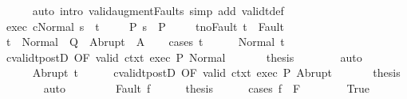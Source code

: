 \begin{isabellebody}
\ \ \ \ \isamarkupfalse%
\ {\isacharparenleft}auto\ intro{\isacharcolon}\ valid{\isacharunderscore}augment{\isacharunderscore}Faults\ simp\ add{\isacharcolon}\ validt{\isacharunderscore}def{\isacharparenright}\isanewline
\ \ \isamarkupfalse%
\ exec{\isacharcolon}\ {\isachardoublequoteopen}{\isasymGamma}{\isasymturnstile}{\isasymlangle}c{\isacharcomma}Normal\ s{\isasymrangle}\ {\isasymRightarrow}\ t{\isachardoublequoteclose}\ \isanewline
\ \ \isamarkupfalse%
\ P{\isacharcolon}\ {\isachardoublequoteopen}s\ {\isasymin}\ P{\isachardoublequoteclose}\ \isanewline
\ \ \isamarkupfalse%
\ t{\isacharunderscore}noFault{\isacharcolon}\ {\isachardoublequoteopen}t\ {\isasymnotin}\ Fault\ {\isacharbackquote}\ {\isacharbraceleft}{\isacharbraceright}{\isachardoublequoteclose}\isanewline
\ \ \isamarkupfalse%
\ {\isachardoublequoteopen}t\ {\isasymin}\ Normal\ {\isacharbackquote}\ Q\ {\isasymunion}\ Abrupt\ {\isacharbackquote}\ A{\isachardoublequoteclose}\isanewline
\ \ \isamarkupfalse%
\ {\isacharparenleft}cases\ t{\isacharparenright}\isanewline
\ \ \ \ \isamarkupfalse%
\ {\isacharparenleft}Normal\ t{\isacharprime}{\isacharparenright}\isanewline
\ \ \ \ \isamarkupfalse%
\ cvalidt{\isacharunderscore}postD\ {\isacharbrackleft}OF\ valid\ ctxt{\isacharprime}{\isacharprime}\ exec\ P{\isacharbrackright}\ Normal\ \isanewline
\ \ \ \ \isamarkupfalse%
\ {\isacharquery}thesis\isanewline
\ \ \ \ \ \ \isamarkupfalse%
\ auto\isanewline
\ \ \isamarkupfalse%
\isanewline
\ \ \ \ \isamarkupfalse%
\ {\isacharparenleft}Abrupt\ t{\isacharprime}{\isacharparenright}\isanewline
\ \ \ \ \isamarkupfalse%
\ cvalidt{\isacharunderscore}postD\ {\isacharbrackleft}OF\ valid\ ctxt{\isacharprime}{\isacharprime}\ exec\ P{\isacharbrackright}\ Abrupt\ \isanewline
\ \ \ \ \isamarkupfalse%
\ {\isacharquery}thesis\isanewline
\ \ \ \ \ \ \isamarkupfalse%
\ auto\isanewline
\ \ \isamarkupfalse%
\isanewline
\ \ \ \ \isamarkupfalse%
\ {\isacharparenleft}Fault\ f{\isacharparenright}\isanewline
\ \ \ \ \isamarkupfalse%
\ {\isacharquery}thesis\isanewline
\ \ \ \ \isamarkupfalse%
\ {\isacharparenleft}cases\ {\isachardoublequoteopen}f\ {\isasymin}\ F{\isachardoublequoteclose}{\isacharparenright}\isanewline
\ \ \ \ \ \ \isamarkupfalse%
\ True\isanewline
\ \ \ \ \ \ \isamarkupfalse%

\end{isabellebody}
